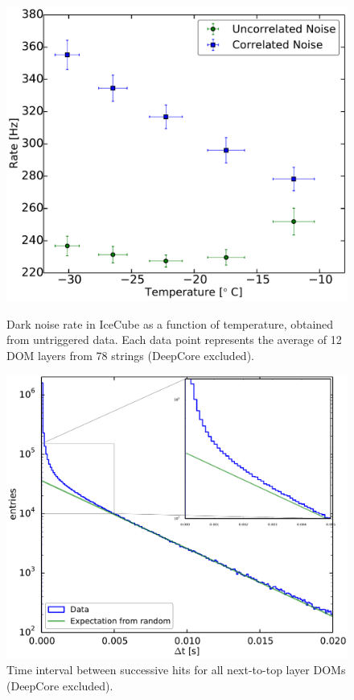 \begin{figure}
 \begin{minipage}[t]{0.45\linewidth}
 \centering
  \includegraphics[width=\textwidth]{graphics/dom/performance/darknoise/HitRatevsTemp_inice_nomuons_nofit_bigfont.pdf}
 \caption{Dark noise rate in IceCube as a function of temperature, obtained from untriggered
 data. Each data point represents the average of 12 DOM layers from 78 strings (DeepCore excluded).}
 \label{fig:dom_darknoise_vs_temperature}
 \end{minipage}
\hfill
 \begin{minipage}[t]{0.45\linewidth}
 \centering
  \includegraphics[width=\textwidth]{graphics/dom/performance/darknoise/DarkNoise_Layer2Doms.pdf}
 \caption{Time interval between successive hits for all next-to-top layer DOMs (DeepCore excluded).}
 \label{fig:darknoise_deltaT}
 \end{minipage}
\end{figure}

